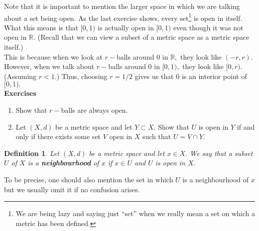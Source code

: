 \documentclass{article}
\newtheorem{defn}{Definition}
\begin{document}
	Note that it is important to mention the larger space in which we are talking about a set being open. As the last exercise shows, every set\footnote{We are being lazy and saying just ``set'' when we really mean a set on which a metric has been defined.} is open in itself. What this means is that $[0, 1)$ is actually open in $[0, 1)$ even though it was not open in $\mathbb{R}.$ (Recall that we can view a subset of a metric space as a metric space itself.)\\
	This is because when we look at $r-$balls around $0$ in $\mathbb{R},$ they look like $(-r, r).$ However, when we talk about $r-$balls around $0$ in $[0, 1),$ they look like $[0, r).$ (Assuming $r < 1.$) Thus, choosing $r = 1/2$ gives us that $0$ is an interior point of $[0, 1).$\\
	\textbf{Exercises}
	\begin{enumerate}[nosep] 
		\item Show that $r-$balls are always open.
		\item Let $(X, d)$ be a metric space and let $Y \subset X.$ Show that $U$ is open in $Y$ if and only if there exists some set $V$ open in $X$ such that $U = V \cap Y.$
	\end{enumerate}
	\begin{defn}
		Let $(X, d)$ be a metric space and let $x \in X.$ We say that a subset $U$ of $X$ is a \textbf{neighbourhood} of $x$ if $x \in U$ and $U$ is open in $X.$
	\end{defn}
	To be precise, one should also mention the set in which $U$ is a neighbourhood of $x$ but we usually omit it if no confusion arises. 
\end{document}
